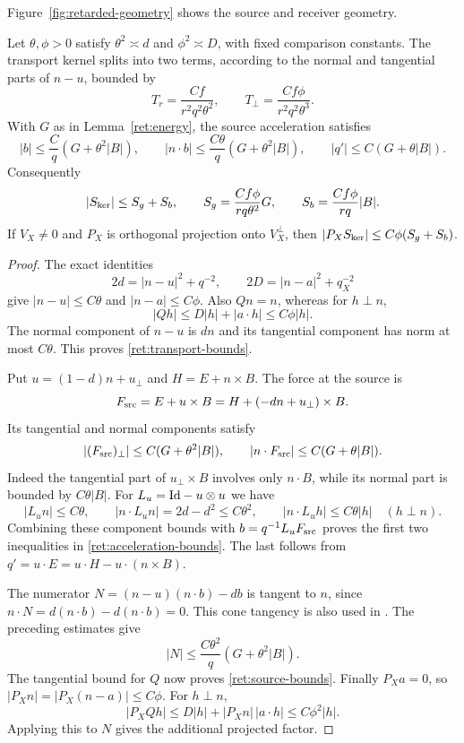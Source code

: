 Figure~\ref{fig:retarded-geometry} shows the source and receiver geometry.


\begin{lemma}\label{ret:direct-bounds}
Let $\theta,\phi>0$ satisfy $\theta^2\asymp d$ and $\phi^2\asymp D$,
with fixed comparison constants. The transport kernel splits into two
terms, according to the normal and tangential parts of $n-u$, bounded by
\begin{equation}\label{ret:transport-bounds}
 T_r=\frac{Cf}{r^2q^2\theta^2},\qquad
 T_\perp=\frac{Cf\phi}{r^2q^2\theta^3}.
\end{equation}
With $G$ as in Lemma~\ref{ret:energy}, the source acceleration satisfies
\begin{equation}\label{ret:acceleration-bounds}
 |b|\leq\frac Cq(G+\theta^2|B|),\qquad
 |n\cdot b|\leq\frac{C\theta}q(G+\theta^2|B|),\qquad
 |q'|\leq C(G+\theta|B|).
\end{equation}
Consequently
\begin{equation}\label{ret:source-bounds}
 |S_{\rm ker}|\leq S_g+S_b,\qquad
 S_g=\frac{Cf\phi}{rq\theta^2}G,\qquad
 S_b=\frac{Cf\phi}{rq}|B|.
\end{equation}
If $V_X\ne0$ and $P_X$ is orthogonal projection onto $V_X^\perp$, then
$|P_XS_{\rm ker}|\leq C\phi(S_g+S_b)$.
\end{lemma}

\begin{proof}
The exact identities
\[
 2d=|n-u|^2+q^{-2},\qquad
 2D=|n-a|^2+q_X^{-2}
\]
give $|n-u|\leq C\theta$ and $|n-a|\leq C\phi$.
Also $Qn=n$, whereas for $h\perp n$,
\[
 |Qh|\leq D|h|+|a\cdot h|\leq C\phi|h|.
\]
The normal component of $n-u$ is $dn$ and its tangential component has
norm at most $C\theta$. This proves \eqref{ret:transport-bounds}.

Put $u=(1-d)n+u_\perp$ and $H=E+n\times B$. The force at the source is
\[
 F_{\rm src}=E+u\times B=H+(-dn+u_\perp)\times B.
\]
Its tangential and normal components satisfy
\[
 |(F_{\rm src})_\perp|\leq C(G+\theta^2|B|),\qquad
 |n\cdot F_{\rm src}|\leq C(G+\theta|B|).
\]
Indeed the tangential part of $u_\perp\times B$ involves only
$n\cdot B$, while its normal part is bounded by $C\theta|B|$.
For $L_u=\mathrm{Id}-u\otimes u$ we have
\[
 |L_un|\leq C\theta,\qquad
 |n\cdot L_un|=2d-d^2\leq C\theta^2,
 \qquad |n\cdot L_uh|\leq C\theta|h|\quad(h\perp n).
\]
Combining these component bounds with $b=q^{-1}L_uF_{\rm src}$ proves
the first two inequalities in \eqref{ret:acceleration-bounds}.
The last follows from $q'=u\cdot E=u\cdot H-u\cdot(n\times B)$.

The numerator $N=(n-u)(n\cdot b)-db$ is tangent to $n$, since
$n\cdot N=d(n\cdot b)-d(n\cdot b)=0$. This cone tangency is also used
in \cite[Lemma~2.1]{Pallard2015Refined}. The preceding estimates give
\[
 |N|\leq\frac{C\theta^2}{q}(G+\theta^2|B|).
\]
The tangential bound for $Q$ now proves \eqref{ret:source-bounds}.
Finally $P_Xa=0$, so $|P_Xn|=|P_X(n-a)|\leq C\phi$. For $h\perp n$,
\[
 |P_XQh|\leq D|h|+|P_Xn|\,|a\cdot h|
               \leq C\phi^2|h|.
\]
Applying this to $N$ gives the additional projected factor.
\end{proof}


